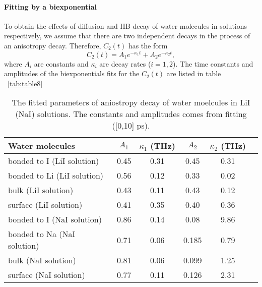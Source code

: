 \paragraph{Fitting by a biexponential}
To obtain the effects of diffusion and HB decay of water molecules in solutions respectively, we assume that there are two independent decays in the process of an anisotropy decay. 
Therefore, $C_2(t)$ has the form\cite{TanHS05}
\begin{equation}
C_2(t)=A_1e^{-\kappa_1 t} +A_2e^{-\kappa_2 t},
\label{eq:tcf3}
\end{equation}
where $A_i$ are constants and $\kappa_i$ are decay rates ($i=1,2$). 
The time constants and amplitudes of the biexponentials fits for the $C_2(t)$ are listed in table ~\ref{tab:table8}
\begin{table}  %
\caption{\label{tab:table8}%
The fitted parameters of aniostropy decay of water moelcules in LiI (NaI) solutions. The constants and amplitudes comes from fitting ([0,10] ps).}
\begin{tabular}{lccccc}
Water molecules & $A_1$  & $\kappa_1$ (THz) & $A_2$ & $\kappa_2$ (THz) \\
\hline
bonded to I (LiI solution)  &0.45 & 0.31  & 0.45 & 0.31\\
bonded to Li (LiI solution) & 0.56 & 0.12 & 0.33 &0.02  \\
bulk (LiI solution) &0.43  & 0.11& 0.43 & 0.12 \\
surface (LiI solution) & 0.41 & 0.35 & 0.40  & 0.36 \\
bonded to I (NaI solution) &0.86 & 0.14 & 0.08 &9.86 \\
bonded to Na (NaI solution) & 0.71 & 0.06 & 0.185 &0.79 \\
bulk (NaI solution) & 0.81 & 0.06 & 0.099  &1.25  \\
surface (NaI solution) & 0.77 & 0.11& 0.126 & 2.31 \\
\end{tabular}
\label{biexponential}
\end{table}

